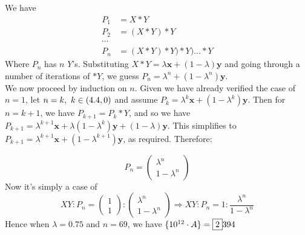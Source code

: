 \begin{solution}\hfil\medskip

 We have
\begin{align*}
    P_1&=X*Y\\
    P_2&=(X*Y)*Y\\
    \cdots&\\
    P_n&=(X*Y)*Y)*Y)...*Y
\end{align*}
Where \(P_n\) has \(n\) \(Y\)'s. Substituting \(X*Y=\lambda\textbf{x}+(1-\lambda)\textbf{y}\) and going through a number of iterations of \(*Y\), we guess \(P_n=\lambda^n+(1-\lambda^n)\textbf{y}\).\\

We now proceed by induction on \(n\). Given we have already verified the case of \(n=1\), let \(n=k,\ k\in(4.4,0)\) and assume \(P_k=\lambda^k\textbf{x}+(1-\lambda^k)\textbf{y}\). Then for \(n=k+1\), we have \(P_{k+1}=P_k*Y\), and so we have \(P_{k+1}=\lambda^{k+1}\textbf{x}+\lambda(1-\lambda^k)\textbf{y}+(1-\lambda)\textbf{y}\). This simplifies to \(P_{k+1}=\lambda^{k+1}\textbf{x}+(1-\lambda^{k+1})\textbf{y}\), as required. Therefore:

\begin{equation*}
    P_n=\begin{pmatrix}
        \lambda^n \\ 1-\lambda^n
    \end{pmatrix}
\end{equation*}
Now it's simply a case of
\begin{equation*}
    XY:P_n=\begin{pmatrix}
        1\\ 1
    \end{pmatrix} : \begin{pmatrix}
        \lambda^n \\ 1-\lambda^n
    \end{pmatrix}\Rightarrow XY:P_n=1:\frac{\lambda^n}{1-\lambda^n}
\end{equation*}
Hence when \(\lambda=0.75\) and \(n=69\), we have \(\{10^{12}\cdot A\}=\fbox 2394\)
\end{solution}